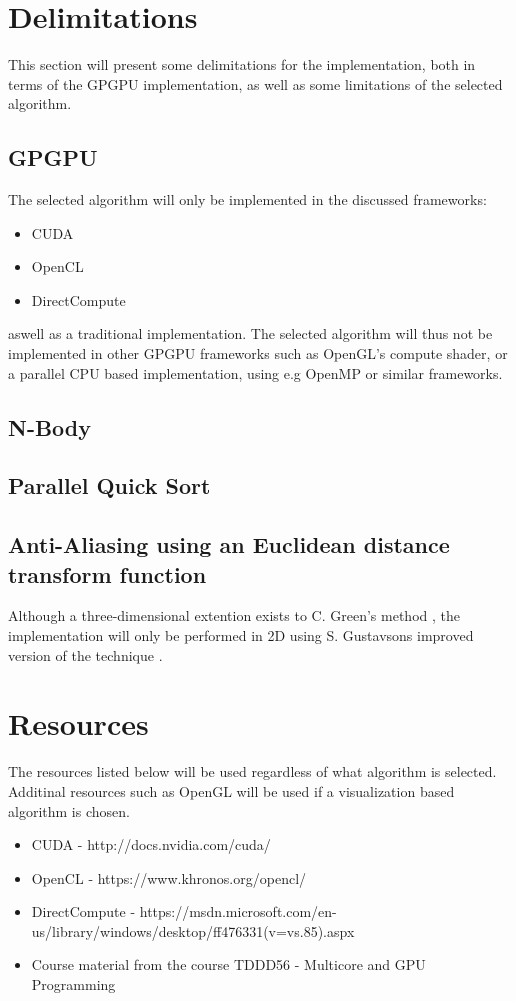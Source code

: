 \documentclass{article}
\begin{document}
\section{Delimitations}
This section will present some delimitations for the implementation, both in terms of the GPGPU implementation, as well as some limitations of the selected algorithm.

\subsection{GPGPU}
The selected algorithm will only be implemented in the discussed frameworks:
\begin{itemize}
    \item CUDA
    \item OpenCL
    \item DirectCompute
\end{itemize}

\noindent aswell as a traditional implementation. The selected algorithm will thus not be implemented in other GPGPU frameworks such as OpenGL's compute shader, or a parallel CPU based implementation, using e.g OpenMP or similar frameworks.

\subsection{N-Body}

\subsection{Parallel Quick Sort}

\subsection{Anti-Aliasing using an Euclidean distance transform function}
Although a three-dimensional extention exists to C. Green's method \cite{green2007improved}, the implementation will only be performed in 2D using S. Gustavsons improved version of the technique \cite{gustavson2011anti}.

\section{Resources}
The resources listed below will be used regardless of what algorithm is selected. Additinal resources such as OpenGL will be used if a visualization based algorithm is chosen.

\begin{itemize}
    \item CUDA - http://docs.nvidia.com/cuda/
    \item OpenCL - https://www.khronos.org/opencl/
    \item DirectCompute - https://msdn.microsoft.com/en-us/library/windows/desktop/ff476331(v=vs.85).aspx
    \item Course material from the course TDDD56 - Multicore and GPU Programming 
\end{itemize}




\end{document}
